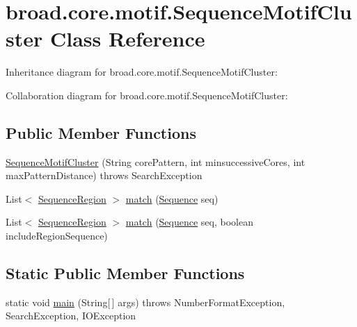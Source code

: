 \hypertarget{classbroad_1_1core_1_1motif_1_1_sequence_motif_cluster}{\section{broad.\+core.\+motif.\+Sequence\+Motif\+Cluster Class Reference}
\label{classbroad_1_1core_1_1motif_1_1_sequence_motif_cluster}
}


Inheritance diagram for broad.\+core.\+motif.\+Sequence\+Motif\+Cluster\+:


Collaboration diagram for broad.\+core.\+motif.\+Sequence\+Motif\+Cluster\+:
\subsection*{Public Member Functions}
\begin{DoxyCompactItemize}
\item 
\hyperlink{classbroad_1_1core_1_1motif_1_1_sequence_motif_cluster_abc01aba2efbdb2c70662910c3c1d86ec}{Sequence\+Motif\+Cluster} (String core\+Pattern, int minsuccessive\+Cores, int max\+Pattern\+Distance)  throws Search\+Exception 
\item 
List$<$ \hyperlink{classbroad_1_1core_1_1sequence_1_1_sequence_region}{Sequence\+Region} $>$ \hyperlink{classbroad_1_1core_1_1motif_1_1_sequence_motif_cluster_a8ab9d3f1f5333f4978b8be5dc0ec1ab2}{match} (\hyperlink{classbroad_1_1core_1_1sequence_1_1_sequence}{Sequence} seq)
\item 
List$<$ \hyperlink{classbroad_1_1core_1_1sequence_1_1_sequence_region}{Sequence\+Region} $>$ \hyperlink{classbroad_1_1core_1_1motif_1_1_sequence_motif_cluster_ae8d4792b7e4f87379cfa7ef98cd1b7c4}{match} (\hyperlink{classbroad_1_1core_1_1sequence_1_1_sequence}{Sequence} seq, boolean include\+Region\+Sequence)
\end{DoxyCompactItemize}
\subsection*{Static Public Member Functions}
\begin{DoxyCompactItemize}
\item 
static void \hyperlink{classbroad_1_1core_1_1motif_1_1_sequence_motif_cluster_a2c060687fcab431e1aa54196582ead6b}{main} (String\mbox{[}$\,$\mbox{]} args)  throws Number\+Format\+Exception, Search\+Exception, I\+O\+Exception 
\end{DoxyCompactItemize}
